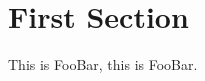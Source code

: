 \documentclass{article}
\begin{document}
\section{First Section}
\def\mytext{FooBar}
\let\yourtext=\mytext

This is \mytext, this is \yourtext.
\end{document}
